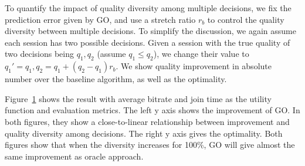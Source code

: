\label{subsec:impact-diversity}

To quantify the impact of quality diversity among multiple decisions, we fix the prediction error given by GO, and use a stretch ratio $r_b$ to control the quality diversity between multiple decisions. To simplify the discussion, we again assume each session has two possible decisions. Given a session with the true quality of two decisions being $q_1, q_2$ (assume $q_1\leq q_2$), we change their value to $q_1'=q_1, q_2=q_1+(q_2-q_1)r_b$. We show quality improvement in absolute number over the baseline algorithm, as well as the optimality.


\begin{figure}[h!]
\centering
{}
\hspace{-0.6cm}
\label{fig:trace-diversity}
\end{figure}

Figure~\ref{fig:trace-diversity} shows the result with average bitrate and join time as the utility function and evaluation metrics. The left y axis shows the improvement of GO. In both figures, they show a close-to-linear relationship between improvement and quality diversity among decisions. 
The right y axis gives the optimality. Both figures show that when the diversity increases for 100\%, GO will give almost the same improvement as oracle approach. 



